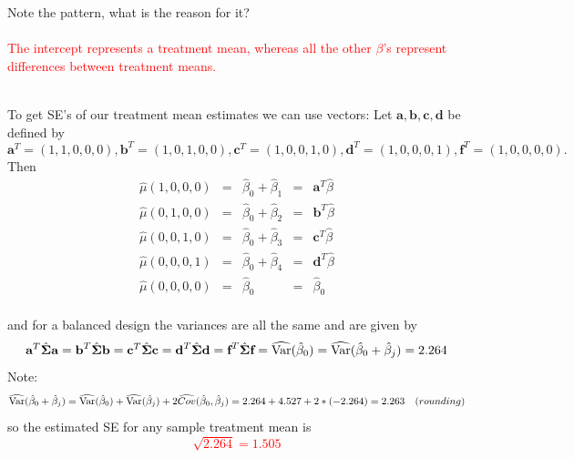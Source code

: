 Note the pattern, what is the reason for it?%
\textcolor{red}{\\~\\The intercept represents a treatment mean, whereas all the other $\beta$'s represent differences between treatment means.}\\~\\

\newpage

To get SE's of our treatment mean estimates we can use vectors:  Let $\textbf{a},\textbf{b},\textbf{c},\textbf{d}$ be defined by 
$$\textbf{a}^{T}=(1,1,0,0,0), \textbf{b}^{T}=(1,0,1,0,0), \textbf{c}^{T}=(1,0,0,1,0), \textbf{d}^{T}=(1,0,0,0,1), \textbf{f}^{T}=(1,0,0,0,0).$$
Then
\[
\begin{array}{lclcl}
\hat\mu(1,0,0,0) & = & \hat\beta_0  + \hat\beta_1 & = & \textbf{a}^{T}\hat\beta \\
\hat\mu(0,1,0,0) & = & \hat\beta_0  + \hat\beta_2 & = & \textbf{b}^{T}\hat\beta \\
\hat\mu(0,0,1,0) & = & \hat\beta_0  + \hat\beta_3 & = & \textbf{c}^{T}\hat\beta \\
\hat\mu(0,0,0,1) & = & \hat\beta_0  + \hat\beta_4 & = & \textbf{d}^{T}\hat\beta \\
\hat\mu(0,0,0,0) & = & \hat\beta_0  & = & \hat\beta_0 
\end{array}
\]~\\
and for a balanced design the variances are all the same and are given by
$$\textbf{a}^{T} \hat{\boldsymbol{\Sigma}} \textbf{a} = \textbf{b}^{T} \hat{\boldsymbol{\Sigma}} \textbf{b} = \textbf{c}^{T} \hat{\boldsymbol{\Sigma}} \textbf{c} = \textbf{d}^{T} \hat{\boldsymbol{\Sigma}} \textbf{d} = \textbf{f}^{T}\hat{\boldsymbol{\Sigma}}\textbf{f}= \widehat{\mbox{Var}}(\hat\beta_0) = \widehat{\mbox{Var}}(\hat\beta_0 + \hat\beta_j) = 2.264$$
Note: 
$$\widehat{\mbox{Var}}(\hat\beta_0 + \hat\beta_j) =\widehat{\mbox{Var}}(\hat\beta_0)+\widehat{\mbox{Var}}(\hat\beta_j)+2\widehat{Cov}(\hat\beta_0,\hat\beta_j) = 2.264+4.527+2*(-2.264)=2.263~~~(rounding)$$
so the estimated SE for any sample treatment mean is %
\textcolor{red}{$$\sqrt{2.264}=1.505$$}\\~\\

